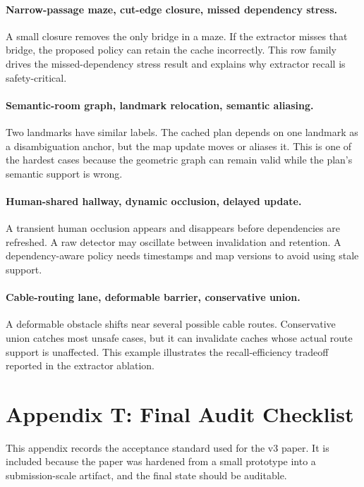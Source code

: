 \documentclass{article}
\begin{document}
\paragraph{Narrow-passage maze, cut-edge closure, missed dependency stress.}
A small closure removes the only bridge in a maze. If the extractor misses that bridge, the proposed policy can retain the cache incorrectly. This row family drives the missed-dependency stress result and explains why extractor recall is safety-critical.

\paragraph{Semantic-room graph, landmark relocation, semantic aliasing.}
Two landmarks have similar labels. The cached plan depends on one landmark as a disambiguation anchor, but the map update moves or aliases it. This is one of the hardest cases because the geometric graph can remain valid while the plan's semantic support is wrong.

\paragraph{Human-shared hallway, dynamic occlusion, delayed update.}
A transient human occlusion appears and disappears before dependencies are refreshed. A raw detector may oscillate between invalidation and retention. A dependency-aware policy needs timestamps and map versions to avoid using stale support.

\paragraph{Cable-routing lane, deformable barrier, conservative union.}
A deformable obstacle shifts near several possible cable routes. Conservative union catches most unsafe cases, but it can invalidate caches whose actual route support is unaffected. This example illustrates the recall-efficiency tradeoff reported in the extractor ablation.

\section{Appendix T: Final Audit Checklist}

This appendix records the acceptance standard used for the v3 paper. It is included because the paper was hardened from a small prototype into a submission-scale artifact, and the final state should be auditable.
\end{document}

